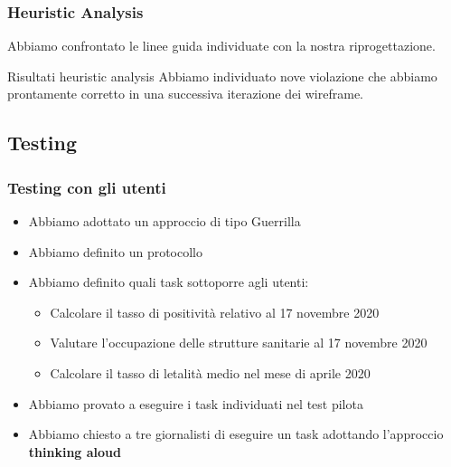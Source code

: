 \documentclass[handout]{beamer}
\begin{document}
		\begin{frame}
			\frametitle{Heuristic Analysis}
			Abbiamo confrontato le linee guida individuate con la nostra riprogettazione. \newline \newline
			\begin{block}{Risultati heuristic analysis}
				Abbiamo individuato nove violazione che abbiamo prontamente corretto in una successiva iterazione dei wireframe.
		\end{block}
		\end{frame}

		\subsection{Testing}
		\begin{frame}
			\frametitle{Testing con gli utenti}
			\begin{itemize}[<+->]
				\item Abbiamo adottato un approccio di tipo Guerrilla\\ 
				\item Abbiamo definito un protocollo\\
				\item Abbiamo definito quali task sottoporre agli utenti:
					\begin{itemize}[<+->]
						\item Calcolare il tasso di positività relativo al 17 novembre 2020\\
						\item Valutare l'occupazione delle strutture sanitarie al 17 novembre 2020\\
						\item Calcolare il tasso di letalità medio nel mese di aprile 2020\\
					\end{itemize}
				\item Abbiamo provato a eseguire i task individuati nel test pilota\\
				\item Abbiamo chiesto a tre giornalisti di eseguire un task adottando l'approccio \textbf{thinking aloud}\\
			\end{itemize}
		\end{frame}
\end{document}

